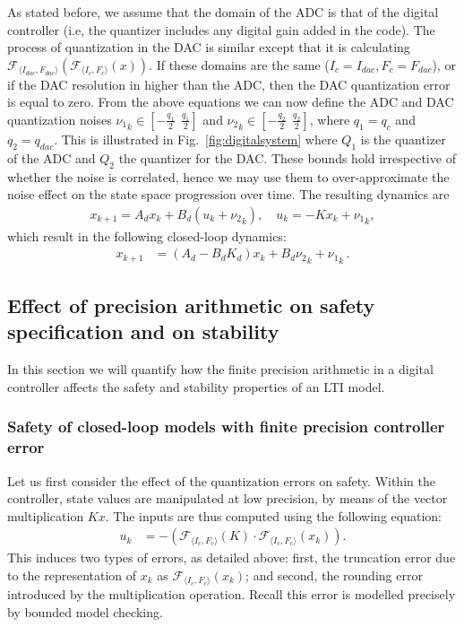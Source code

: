 \documentclass[twocolumn]{autart}    %
\begin{document}
As stated before, we assume that the domain of the
ADC is that of the digital controller (i.e, the quantizer includes any
digital gain added in the code).  The process of quantization in the DAC is
similar except that it is calculating $\mathcal{F}_{\langle I_{dac},F_{dac}
\rangle} (\mathcal{F}_{\langle I_{c},F_{c} \rangle }(x)) $.  If these domains
are the same ($I_{c}=I_{dac},\allowbreak F_{c}=F_{dac}$), or if the DAC
resolution in higher than the ADC, then the DAC quantization error is equal
to zero.  From the above equations we can now define the ADC and DAC
quantization noises ${\nu_1}_k \in [-\frac{q_1}{2}\ \ \frac{q_1}{2}]$ and
${\nu_2}_k \in [-\frac{q_2}{2}\ \ \frac{q_2}{2}]$, where $q_1=q_{c}$ and 
$q_2=q_\mathit{dac}$.  This is illustrated in
Fig.~\ref{fig:digitalsystem} where $Q_1$ is the quantizer of the ADC
and $Q_2$ the quantizer for the DAC.  These bounds hold irrespective of
whether the noise is correlated, hence we may use them to over-approximate
the noise effect on the state space progression over time.  The
resulting dynamics are
%
\begin{align*}
{x}_{k+1} = {A}_d{x}_k+{B}_d({u}_k+{{\nu}_2}_k), \quad u_k = -K{x}_{k}+{{\nu}_1}_k, 
\end{align*}
%
which result in the following closed-loop dynamics:
%
\begin{align*}
{x}_{k+1} &= ({A}_d-{B}_d{K}_d) {x}_k+{B}_d{{\nu}_2}_k +{{\nu}_1}_k \,. 
\end{align*}

\fi


\subsection{Effect of precision arithmetic on safety specification and on stability} 

In this section we will quantify how the finite precision arithmetic in a digital controller affects the
safety and stability properties of an LTI model. 

\subsubsection{Safety of closed-loop models with finite precision controller error} 

Let us first consider the effect of the quantization errors on safety. 
Within the controller, state values are manipulated at low precision,
by means of the vector multiplication $Kx$.
The inputs are thus computed using the following equation: 
%
\begin{align*}
u_{k}&=-(\mathcal{F}_{\langle I_c,F_c \rangle}(K)\cdot\mathcal{F}_{\langle I_c,F_c \rangle}(x_{k})). 
\end{align*}
This induces two types of errors, 
as detailed above: 
first, the truncation error due to the representation of $x_k$ as $\mathcal{F}_{\langle I_c,F_c
\rangle}(x_{k})$; and second, the rounding error introduced by the multiplication operation. 
Recall this error is modelled precisely by bounded model checking.
\end{document}
